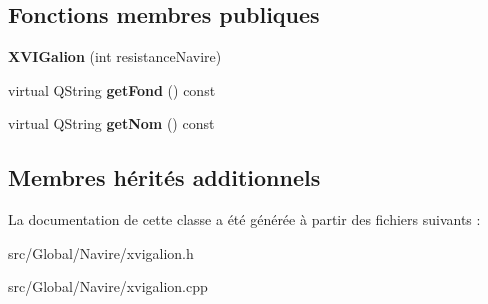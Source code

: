 \subsection*{Fonctions membres publiques}
\begin{DoxyCompactItemize}
\item 
{\bfseries X\+V\+I\+Galion} (int resistance\+Navire)\hypertarget{class_x_v_i_galion_a6dc33193c2b8d2696ca4de898712374a}{}\label{class_x_v_i_galion_a6dc33193c2b8d2696ca4de898712374a}

\item 
virtual Q\+String {\bfseries get\+Fond} () const \hypertarget{class_x_v_i_galion_aff1ffbb0603eafdf4343cbafcf001011}{}\label{class_x_v_i_galion_aff1ffbb0603eafdf4343cbafcf001011}

\item 
virtual Q\+String {\bfseries get\+Nom} () const \hypertarget{class_x_v_i_galion_a1df077a9bfee4aed90f489917c9469ff}{}\label{class_x_v_i_galion_a1df077a9bfee4aed90f489917c9469ff}

\end{DoxyCompactItemize}
\subsection*{Membres hérités additionnels}


La documentation de cette classe a été générée à partir des fichiers suivants \+:\begin{DoxyCompactItemize}
\item 
src/\+Global/\+Navire/xvigalion.\+h\item 
src/\+Global/\+Navire/xvigalion.\+cpp\end{DoxyCompactItemize}
